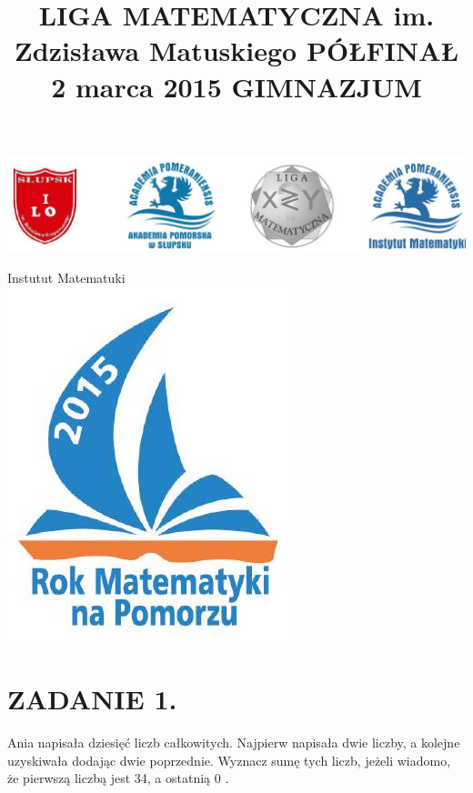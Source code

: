 \documentclass[10pt]{article}
\title{LIGA MATEMATYCZNA im. Zdzisława Matuskiego PÓŁFINAŁ 2 marca 2015 GIMNAZJUM }
\author{}
\date{}
\begin{document}
\maketitle
\begin{center}
\includegraphics[max width=\textwidth]{2024_11_21_d2020224b0bed3a21badg-1(1)}
\end{center}

Instutut Matematuki\\
\includegraphics[max width=\textwidth, center]{2024_11_21_d2020224b0bed3a21badg-1}

\section*{ZADANIE 1.}
Ania napisała dziesięć liczb całkowitych. Najpierw napisała dwie liczby, a kolejne uzyskiwała dodając dwie poprzednie. Wyznacz sumę tych liczb, jeżeli wiadomo, że pierwszą liczbą jest 34, a ostatnią 0 .
\end{document}
